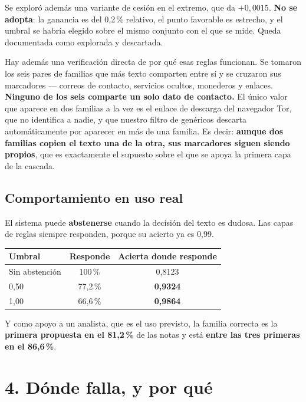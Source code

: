 \documentclass[11pt,a4paper]{article}
\begin{document}
Se exploró además una variante de cesión en el extremo, que da $+0,0015$. \textbf{No se adopta}: la
ganancia es del 0,2\,\% relativo, el punto favorable es estrecho, y el umbral se habría elegido
sobre el mismo conjunto con el que se mide. Queda documentada como explorada y descartada.

Hay además una verificación directa de por qué esas reglas funcionan. Se tomaron los seis pares de
familias que más texto comparten entre sí y se cruzaron sus marcadores --- correos de contacto,
servicios ocultos, monederos y enlaces. \textbf{Ninguno de los seis comparte un solo dato de
contacto.} El único valor que aparece en dos familias a la vez es el enlace de descarga del
navegador Tor, que no identifica a nadie, y que nuestro filtro de genéricos descarta
automáticamente por aparecer en más de una familia. Es decir: \textbf{aunque dos familias copien el
texto una de la otra, sus marcadores siguen siendo propios}, que es exactamente el supuesto sobre
el que se apoya la primera capa de la cascada.

\subsection*{Comportamiento en uso real}

El sistema puede \textbf{abstenerse} cuando la decisión del texto es dudosa. Las capas de reglas
siempre responden, porque su acierto ya es 0,99.

\begin{center}
\small
\begin{tabular}{lcc}
\toprule
\textbf{Umbral} & \textbf{Responde} & \textbf{Acierta donde responde} \\
\midrule
Sin abstención & 100\,\% & 0,8123 \\
0,50 & 77,2\,\% & \textbf{0,9324} \\
1,00 & 66,6\,\% & \textbf{0,9864} \\
\bottomrule
\end{tabular}
\end{center}

Y como apoyo a un analista, que es el uso previsto, la familia correcta es la \textbf{primera
propuesta en el 81,2\,\%} de las notas y está \textbf{entre las tres primeras en el 86,6\,\%}.

\section*{4. Dónde falla, y por qué}
\end{document}
